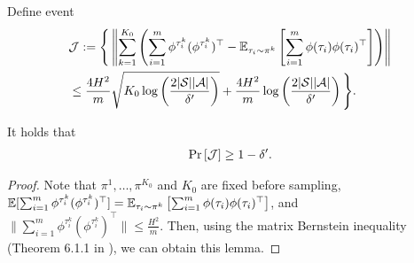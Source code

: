 Define event
\begin{align}
	& \mathcal{J}:=\Bigg\{ \left\|  \sum_{k=1}^{K_0} \left(  \sum_{i=1}^{m} \phi^{\tau^k_i} (\phi^{\tau^k_i})^\top  - \mathbb{E}_{\tau_i \sim \pi^k}\left[ \sum_{i=1}^{m} \phi(\tau_i) \phi(\tau_i)^\top \right]  \right)  \right\| 
	\nonumber\\
	&\leq \frac{4H^2}{m} \sqrt{K_0\log\left( \frac{2|\mathcal{S}||\mathcal{A}|}{\delta'} \right)}  + \frac{4H^2}{m} \log\left( \frac{2|\mathcal{S}||\mathcal{A}|}{\delta'} \right) \Bigg\} .
\end{align}

\begin{lemma} 
	It holds that
	\begin{align*}
		\Pr \left[  \mathcal{J}  \right] \geq 1-\delta' .
	\end{align*}
\end{lemma}
\begin{proof}
	Note that $\pi^1,\dots,\pi^{K_0}$ and $K_0$ are fixed before sampling, $\mathbb{E}[\sum_{i=1}^{m} \phi^{\tau^k_i} (\phi^{\tau^k_i})^\top]=\mathbb{E}_{\tau_i \sim \pi^k}\left[ \sum_{i=1}^{m} \phi(\tau_i) \phi(\tau_i)^\top \right]$, and $\|\sum_{i=1}^{m} \phi^{\tau^k_i} (\phi^{\tau^k_i})^\top\| \leq \frac{H^2}{m}$.
	Then, using the matrix Bernstein inequality (Theorem 6.1.1 in \cite{tropp2015introduction}), we can obtain this lemma.
\end{proof}



